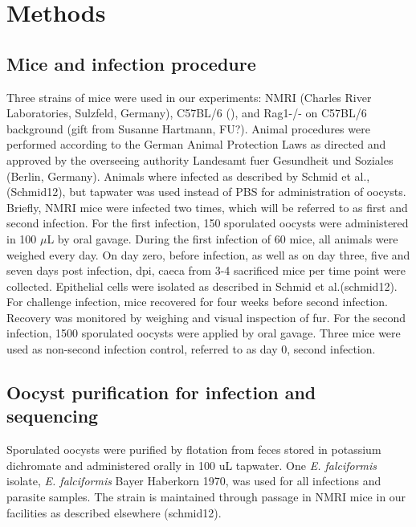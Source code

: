 \documentclass{article}
\begin{document}

\section{Methods}
\subsection{Mice and infection procedure}
Three strains of mice were used in our experiments: NMRI (Charles River Laboratories, Sulzfeld,
Germany), C57BL/6 (), and Rag1-/- on C57BL/6 background (gift from Susanne Hartmann, FU?). 
Animal procedures were performed according to the German Animal Protection Laws as 
directed and approved by the overseeing authority Landesamt fuer Gesundheit und Soziales 
(Berlin, Germany). Animals where infected as described by Schmid et al., (Schmid12), but
tapwater was used instead of PBS for administration of oocysts. Briefly, NMRI mice were infected 
two times, which will be referred to as first and second infection. For the first infection, 
150 sporulated oocysts were administered in 100 $μ$L by oral gavage. During the first infection
of 60 mice, all animals were weighed every day. On day zero, before infection, as well as on day three,
five and seven days post infection, dpi, caeca from 3-4 sacrificed mice per time point were 
collected. Epithelial cells were isolated as described in Schmid et al.(schmid12). For challenge 
infection, mice recovered for four weeks before second infection. 
Recovery was monitored by weighing and visual inspection of fur. For the second infection, 
1500 sporulated oocysts were applied by oral gavage. Three mice were used as non-second infection control, 
referred to as day 0, second infection.

\subsection{Oocyst purification for infection and sequencing}
Sporulated oocysts were purified by flotation from feces stored in potassium dichromate and 
administered orally in 100 uL tapwater. One \textit{E. falciformis} isolate, 
\textit{E. falciformis} Bayer Haberkorn 1970, was used for all infections and parasite 
samples. The strain is maintained through passage in NMRI mice in our facilities as described 
elsewhere (schmid12).
\end{document}
